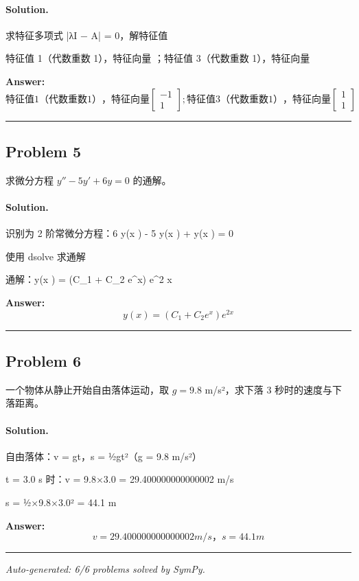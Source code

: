 \documentclass[12pt, a4paper]{article}
\newcommand{\problem}[1]{\subsection*{Problem #1}}
\newcommand{\solution}{\paragraph{Solution.}}
\begin{document}
\solution

求特征多项式 |λI − A| = 0，解特征值

特征值 1（代数重数 1），特征向量 \left[\begin{matrix}-1\\1\end{matrix}\right]；特征值 3（代数重数 1），特征向量 \left[\begin{matrix}1\\1\end{matrix}\right]

\textbf{Answer:}
\[\boxed{特征值 1（代数重数 1），特征向量 \left[\begin{matrix}-1\\1\end{matrix}\right]; 特征值 3（代数重数 1），特征向量 \left[\begin{matrix}1\\1\end{matrix}\right]}\]

\vspace{1em}
\hrule
\vspace{1em}

\problem{5}

求微分方程 $y'' - 5y' + 6y = 0$ 的通解。

\solution

识别为 2 阶常微分方程：6 y{\left(x \right)} - 5  y{\left(x \right)} +  y{\left(x \right)} = 0

使用 dsolve 求通解

通解：y{\left(x \right)} = \left(C\_{1} + C\_{2} e^{x}\right) e^{2 x}

\textbf{Answer:}
\[\boxed{y{\left(x \right)} = \left(C_{1} + C_{2} e^{x}\right) e^{2 x}}\]

\vspace{1em}
\hrule
\vspace{1em}

\problem{6}

一个物体从静止开始自由落体运动，取 $g = 9.8$ m/s²，求下落 3 秒时的速度与下落距离。

\solution

自由落体：v = gt，s = ½gt²（g = 9.8 m/s²）

t = 3.0 s 时：v = 9.8×3.0 = 29.400000000000002 m/s

s = ½×9.8×3.0² = 44.1 m

\textbf{Answer:}
\[\boxed{v = 29.400000000000002 m/s，s = 44.1 m}\]

\vspace{1em}
\hrule
\vspace{1em}


\vspace{2em}
\noindent\textit{Auto-generated: 6/6 problems solved by SymPy.}
\end{document}

